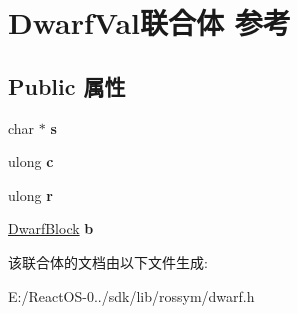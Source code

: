 \hypertarget{union_dwarf_val}{}\section{Dwarf\+Val联合体 参考}
\label{union_dwarf_val}
\subsection*{Public 属性}
\begin{DoxyCompactItemize}
\item 
\mbox{\label{union_dwarf_val_a11cb1cee49f5a299002f85260b887617}} 
char $\ast$ {\bfseries s}
\item 
\mbox{\label{union_dwarf_val_aeac527ab2b9eba018130d6a718fb87dd}} 
ulong {\bfseries c}
\item 
\mbox{\label{union_dwarf_val_a7a4dd6c814d235e87d96b3d67f1690a3}} 
ulong {\bfseries r}
\item 
\mbox{\label{union_dwarf_val_a9152d486c65354168c5ba70c8073fb37}} 
\hyperlink{struct_dwarf_block}{Dwarf\+Block} {\bfseries b}
\end{DoxyCompactItemize}


该联合体的文档由以下文件生成\+:\begin{DoxyCompactItemize}
\item 
E\+:/\+React\+O\+S-\/0../sdk/lib/rossym/dwarf.\+h\end{DoxyCompactItemize}
